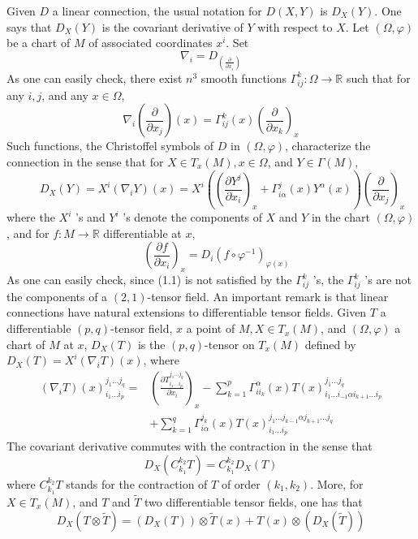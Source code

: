 \documentclass[12pt,hyperref,a4paper,UTF8]{ctexart}
\begin{document}
\vskip 3pt
\noindent 
Given $D$ a linear connection, the usual notation for $D(X, Y)$ is $D_X(Y)$. One says that $D_X(Y)$ is the covariant derivative of $Y$ with respect to $X$. Let $(\Omega, \varphi)$ be a chart of $M$ of associated coordinates $x^i$. Set
$$
\nabla_i=D_{\left(\frac{\partial}{\partial x_i}\right)}
$$
As one can easily check, there exist $n^3$ smooth functions $\Gamma_{i j}^k: \Omega \rightarrow \mathbb{R}$ such that for any $i, j$, and any $x \in \Omega$,
$$
\nabla_i\left(\frac{\partial}{\partial x_j}\right)(x)=\Gamma_{i j}^k(x)\left(\frac{\partial}{\partial x_k}\right)_x
$$
Such functions, the Christoffel symbols of $D$ in $(\Omega, \varphi)$, characterize the connection in the sense that for $X \in T_x(M), x \in \Omega$, and $Y \in \Gamma(M)$,
$$
\qquad D_X(Y)=X^i\left(\nabla_i Y\right)(x)=X^i\left(\left(\frac{\partial Y^j}{\partial x_i}\right)_x+\Gamma_{i \alpha}^j(x) Y^\alpha(x)\right)\left(\frac{\partial}{\partial x_j}\right)_x
$$
where the $X^i$ 's and $Y^i$ 's denote the components of $X$ and $Y$ in the chart $(\Omega, \varphi)$, and for $f: M \rightarrow \mathbb{R}$ differentiable at $x$,
$$
\quad \left(\frac{\partial f}{\partial x_i}\right)_x=D_i\left(f \circ \varphi^{-1}\right)_{\varphi(x)}
$$
As one can easily check, since (1.1) is not satisfied by the $\Gamma_{i j}^k$ 's, the $\Gamma_{i j}^k$ 's are not the components of a $(2,1)$-tensor field. An important remark is that linear connections
have natural extensions to differentiable tensor fields. Given $T$ a differentiable $(p, q)$-tensor field, $x$ a point of $M, X \in T_x(M)$, and $(\Omega, \varphi)$ a chart of $M$ at $x$, $D_X(T)$ is the $(p, q)$-tensor on $T_x(M)$ defined by $D_X(T)=X^i\left(\nabla_i T\right)(x)$, where
$$
\begin{aligned}
\left(\nabla_i T\right)(x)_{i_1 \ldots i_p}^{j_1 \ldots j_q}= & \left(\frac{\partial T_{i_1 \ldots i_p}^{j_1 \ldots j_q}}{\partial x_i}\right)_x-\sum_{k=1}^p \Gamma_{ii_k}^\alpha(x) T(x)_{i_1 \ldots i_{-1} \alpha i_{k+1} \ldots i_p}^{j_1 \ldots j_q} \\
& +\sum_{k=1}^q \Gamma_{i \alpha}^{j_k}(x) T(x)_{i_1 \ldots i_p}^{j_1 \ldots j_{k-1} \alpha j_{k+1} \ldots j_q}
\end{aligned}
$$
The covariant derivative commutes with the contraction in the sense that
$$
D_X\left(C_{k_1}^{k_2} T\right)=C_{k_1}^{k_2} D_X(T)
$$
where $C_{k_1}^{k_2} T$ stands for the contraction of $T$ of order $\left(k_1, k_2\right)$. More, for $X \in T_{{x}}(M)$, and $T$ and $\tilde{T}$ two differentiable tensor fields, one has that
$$
D_X(T \otimes \tilde{T})=\left(D_X(T)\right) \otimes \tilde{T}(x)+T(x) \otimes\left(D_X(\tilde{T})\right)
$$
\end{document}
